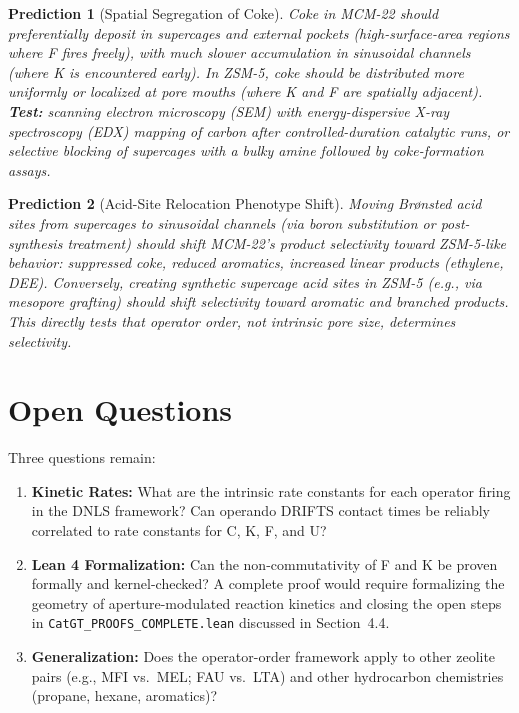\documentclass[11pt]{article}
\newtheorem{prediction}{Prediction}
\begin{document}
\begin{prediction}[Spatial Segregation of Coke]
Coke in MCM-22 should preferentially deposit in supercages and external pockets (high-surface-area regions where F fires freely), with much slower accumulation in sinusoidal channels (where K is encountered early). In ZSM-5, coke should be distributed more uniformly or localized at pore mouths (where K and F are spatially adjacent). \textbf{Test:} scanning electron microscopy (SEM) with energy-dispersive X-ray spectroscopy (EDX) mapping of carbon after controlled-duration catalytic runs, or selective blocking of supercages with a bulky amine followed by coke-formation assays.
\end{prediction}

\begin{prediction}[Acid-Site Relocation Phenotype Shift]
Moving Br\o nsted acid sites from supercages to sinusoidal channels (via boron substitution or post-synthesis treatment) should shift MCM-22's product selectivity toward ZSM-5-like behavior: suppressed coke, reduced aromatics, increased linear products (ethylene, DEE). Conversely, creating synthetic supercage acid sites in ZSM-5 (e.g., via mesopore grafting) should shift selectivity toward aromatic and branched products. This directly tests that operator order, not intrinsic pore size, determines selectivity.
\end{prediction}

\section{Open Questions}

Three questions remain:

\begin{enumerate}
\item \textbf{Kinetic Rates:} What are the intrinsic rate constants for each operator firing in the DNLS framework? Can operando DRIFTS contact times be reliably correlated to rate constants for C, K, F, and U?
\item \textbf{Lean 4 Formalization:} Can the non-commutativity of F and K be proven formally and kernel-checked? A complete proof would require formalizing the geometry of aperture-modulated reaction kinetics and closing the open steps in \texttt{CatGT\_PROOFS\_COMPLETE.lean} discussed in Section~4.4.
\item \textbf{Generalization:} Does the operator-order framework apply to other zeolite pairs (e.g., MFI vs.\ MEL; FAU vs.\ LTA) and other hydrocarbon chemistries (propane, hexane, aromatics)?
\end{enumerate}
\end{document}
